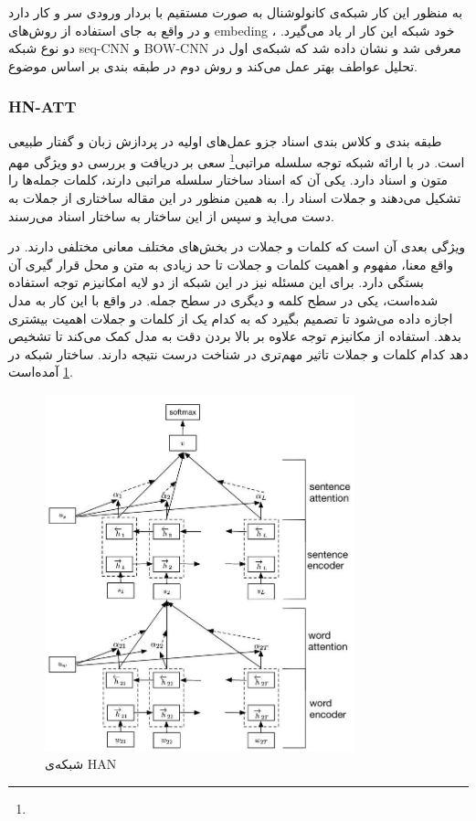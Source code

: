 \documentclass[12pt, a4paper, oneside]{report}
\begin{document}
به منظور این کار شبکه‌ی کانولوشنال به صورت مستقیم با بردار ورودی سر و کار دارد و در واقع به جای استفاده از
روش‌های
embeding
، خود شبکه این کار ار یاد می‌گیرد. دو نوع شبکه
seq-CNN
و
BOW-CNN
معرفی شد و نشان داده شد که شبکه‌ی اول در تحلیل عواطف بهتر عمل می‌کند و روش دوم در طبقه بندی بر اساس موضوع.
\cite{johnson-zhang-2015-effective}

\subsubsection{HN-ATT}

طبقه بندی و کلاس بندی اسناد جزو عمل‌های اولیه در پردازش زبان و گفتار طبیعی است.
در
\cite{yang-etal-2016-hierarchical}
با ارائه شبکه توجه سلسله مراتبی\footnote{}
سعی بر دریافت و بررسی دو ویژگی مهم متون و اسناد دارد. یکی آن که اسناد ساختار سلسله مراتبی دارند، 
کلمات جمله‌ها را تشکیل می‌دهند و جملات اسناد را. به همین منظور در این مقاله ساختاری از جملات به دست می‌اید
و سپس از این ساختار به ساختار اسناد می‌رسند.

ویژگی بعدی آن است که کلمات و جملات در بخش‌های مختلف معانی مختلفی دارند. در واقع معنا، مفهوم و اهمیت
کلمات و جملات تا حد زیادی به متن و محل قرار گیری آن بستگی دارد. برای این مسئله نیز در این شبکه از
دو لایه امکانیزم توجه استفاده شده‌است، یکی در سطح کلمه و دیگری در سطح جمله. در واقع با این کار
به مدل اجازه داده می‌شود تا تصمیم بگیرد که به کدام یک از کلمات و جملات اهمیت بیشتری بدهد.
استفاده از مکانیزم توجه علاوه بر بالا بردن دقت به مدل کمک می‌کند تا تشخیص دهد کدام کلمات و جملات
تاثیر مهم‌تری در شناخت درست نتیجه دارند. ساختار شبکه در
\ref{fig:HAN}
آمده‌است.

\begin{figure}[!ht]
    \centering
    \includegraphics[width=0.8\textwidth]{HAN}
    \caption{شبکه‌ی HAN}
    \label{fig:HAN}
\end{figure}
\end{document}
